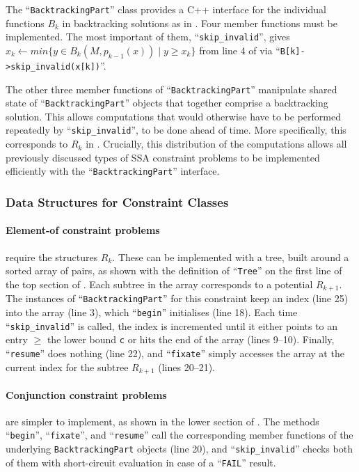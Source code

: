     The ``\texttt{BacktrackingPart}'' class provides a C++ interface
    for the individual functions $B_k$ in backtracking solutions as in
    .
    Four member functions must be implemented.
    The most important of them, ``\texttt{skip\_invalid}'',
    gives $x_k\gets min\{y\in B_k(M,p_{k-1}(x))\mid y\geq x_k\}$
    from line 4 of  via
    ``\texttt{B[k]->skip\_invalid(x[k])}''.

    The other three member functions of
    ``\texttt{BacktrackingPart}'' manipulate shared state
    of ``\texttt{BacktrackingPart}'' objects that together
    comprise a backtracking solution.
    This allows computations that would otherwise have to be performed
    repeatedly by ``\texttt{skip\_invalid}'', to be done ahead of time.
    More specifically, this corresponds to $R_k$ in
    .
    Crucially, this distribution of the computations allows all previously
    discussed types of SSA constraint problems to be implemented efficiently
    with the ``\texttt{BacktrackingPart}'' interface.

\subsubsection{Data Structures for Constraint Classes}

    \paragraph*{Element-of constraint problems} require the structures $R_k$.
    These can be implemented with a tree, built around a sorted array of pairs,
    as shown with the definition of ``\texttt{Tree}'' on the first line of the
    top section of .
    Each subtree in the array corresponds to a potential $R_{k+1}$.
    The instances of ``{\tt BacktrackingPart}'' for this constraint keep an
    index (line 25) into the array (line 3), which ``{\tt begin}'' initialises
    (line 18).
    Each time ``{\tt skip\_invalid}'' is called, the index is incremented until
    it either points to an entry $\geq$ the lower bound {\tt c} or hits the
    end of the array (lines 9--10).
    Finally, ``{\tt resume}'' does nothing (line 22), and ``{\tt fixate}''
    simply accesses the array at the current index for the subtree $R_{k+1}$
    (lines 20--21).

    \paragraph*{Conjunction constraint problems} are simpler to implement, as
    shown in the lower section of .
    The methods ``{\tt begin}'', ``{\tt fixate}'', and ``{\tt resume}'' call the
    corresponding member functions of the underlying {\tt BacktrackingPart}
    objects (line 20), and ``\texttt{skip\_invalid}'' checks both of them with
    short-circuit evaluation in case of a ``{\tt FAIL}'' result.

